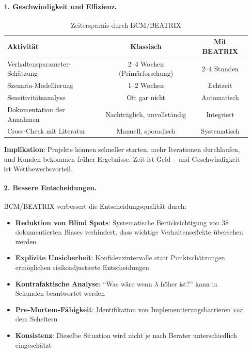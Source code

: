 \paragraph{1. Geschwindigkeit und Effizienz.}

\begin{table}[h]
\centering
\caption{Zeitersparnis durch BCM/BEATRIX}
\begin{tabular}{@{}lcc@{}}
\toprule
\textbf{Aktivität} & \textbf{Klassisch} & \textbf{Mit BEATRIX} \\
\midrule
Verhaltensparameter-Schätzung & 2--4 Wochen (Primärforschung) & 2--4 Stunden \\
Szenario-Modellierung & 1--2 Wochen & Echtzeit \\
Sensitivitätsanalyse & Oft gar nicht & Automatisch \\
Dokumentation der Annahmen & Nachträglich, unvollständig & Integriert \\
Cross-Check mit Literatur & Manuell, sporadisch & Systematisch \\
\bottomrule
\end{tabular}
\end{table}

\textbf{Implikation}: Projekte können schneller starten, mehr Iterationen durchlaufen, und Kunden bekommen früher Ergebnisse. Zeit ist Geld -- und Geschwindigkeit ist Wettbewerbsvorteil.

\paragraph{2. Bessere Entscheidungen.}

BCM/BEATRIX verbessert die Entscheidungsqualität durch:

\begin{itemize}
    \item \textbf{Reduktion von Blind Spots}: Systematische Berücksichtigung von 38 dokumentierten Biases verhindert, dass wichtige Verhaltenseffekte übersehen werden
    \item \textbf{Explizite Unsicherheit}: Konfidenzintervalle statt Punktschätzungen ermöglichen risikoadjustierte Entscheidungen
    \item \textbf{Kontrafaktische Analyse}: ``Was wäre wenn $\lambda$ höher ist?'' kann in Sekunden beantwortet werden
    \item \textbf{Pre-Mortem-Fähigkeit}: Identifikation von Implementierungsbarrieren \textit{vor} dem Scheitern
    \item \textbf{Konsistenz}: Dieselbe Situation wird nicht je nach Berater unterschiedlich eingeschätzt
\end{itemize}

